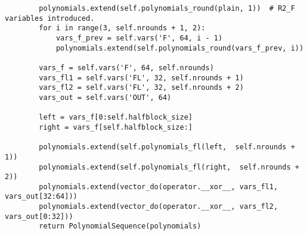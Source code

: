 \begin{lstlisting}
        polynomials.extend(self.polynomials_round(plain, 1))  # R2_F variables introduced.
        for i in range(3, self.nrounds + 1, 2):
            vars_f_prev = self.vars('F', 64, i - 1)
            polynomials.extend(self.polynomials_round(vars_f_prev, i))

        vars_f = self.vars('F', 64, self.nrounds)
        vars_fl1 = self.vars('FL', 32, self.nrounds + 1)
        vars_fl2 = self.vars('FL', 32, self.nrounds + 2)
        vars_out = self.vars('OUT', 64)

        left = vars_f[0:self.halfblock_size]
        right = vars_f[self.halfblock_size:]

        polynomials.extend(self.polynomials_fl(left,  self.nrounds + 1))
        polynomials.extend(self.polynomials_fl(right,  self.nrounds + 2))
        polynomials.extend(vector_do(operator.__xor__, vars_fl1, vars_out[32:64]))
        polynomials.extend(vector_do(operator.__xor__, vars_fl2, vars_out[0:32]))
        return PolynomialSequence(polynomials)
\end{lstlisting}


\label{app:misty-solve}

